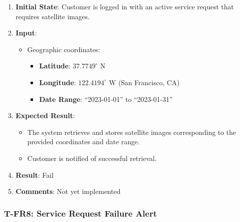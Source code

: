 \documentclass[12pt, titlepage]{article}
\begin{document}
\begin{enumerate}
    \item \textbf{Initial State}: Customer is logged in with an active service request that requires satellite images.
    \item \textbf{Input}:
    \begin{itemize}
        \item Geographic coordinates:
        \begin{itemize}
            \item \textbf{Latitude}: $37.7749^\circ$ N
            \item \textbf{Longitude}: $122.4194^\circ$ W (San Francisco, CA)
            \item \textbf{Date Range}: ``2023-01-01'' to ``2023-01-31''
        \end{itemize}
    \end{itemize}
        \item \textbf{Expected Result}:
        \begin{itemize}
            \item The system retrieves and stores satellite images corresponding to the provided coordinates and date range.
            \item Customer is notified of successful retrieval.
        \end{itemize}
        \item \textbf{Result}: Fail
        \item \textbf{Comments}: Not yet implemented
\end{enumerate}

\subsubsection*{T-FR8: Service Request Failure Alert}
\end{document}
